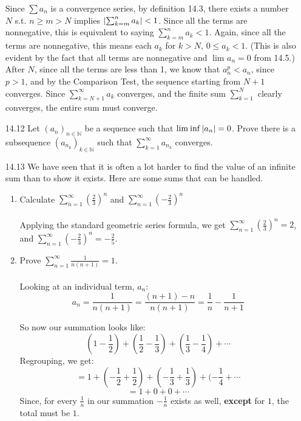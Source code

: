 \begin{enumerate}
    Since $\sum a_n$ is a convergence series, by definition 14.3, there exists a number $N$ s.t. $n \geq m > N$ implies $\left\vert \sum_{k=m}^n a_k \right\vert < 1$. Since all the terms are nonnegative, this is equivalent to saying $\sum_{k=m}^n a_k < 1$. Again, since all the terms are nonnegative, this means each $a_k$ for $k > N$, $0 \leq a_k < 1$. (This is also evident by the fact that all terms are nonnegative and $\lim_{} a_n = 0$ from 14.5.)\\

    After $N$, since all the terms are less than 1, we know that $a_n^p < a_n$, since $p > 1$, and by the Comparison Test, the sequence starting from $N+1$ converges. Since $\sum_{k=N+1}^\infty a_k$ converges, and the finite sum $\sum_{k=1}^N$ clearly converges, the entire sum must converge.
  \item [14.12]
    Let $(a_n)_{n \in \mathds{N}}$ be a sequence such that $\lim_{} \inf \left\vert a_n \right\vert = 0$. Prove there is a subsequence $(a_{n_k})_{k \in \mathds{N}}$ such that $\sum_{k=1}^\infty a_{n_k}$ converges. 
  \item [14.13]
    We have seen that it is often a lot harder to find the value of an infinite sum than to show it exists. Here are some sums that can be handled.
    \begin{enumerate}
      \item Calculate $\sum_{n=1}^\infty (\frac{2}{3})^n$ and $\sum_{n=1}^\infty (- \frac{2}{3})^n$\\\\

        Applying the standard geometric series formula, we get $\sum_{n=1}^\infty (\frac{2}{3})^n = 2$, and $\sum_{n=1}^\infty (- \frac{2}{3})^n = - \frac{2}{5}$.
      \item Prove $\sum_{n=1}^\infty \frac{1}{n(n+1)} = 1$.\\\\

        Looking at an individual term, $a_n$:
        $$a_n = \frac{1}{n(n+1)} = \frac{(n+1) - n}{n(n+1)} = \frac{1}{n} - \frac{1}{n+1}$$

        So now our summation looks like:
        $$(1 - \frac{1}{2}) + (\frac{1}{2} - \frac{1}{3}) + (\frac{1}{3} - \frac{1}{4}) + \cdots$$
        Regrouping, we get:
        $$= 1 + (- \frac{1}{2} + \frac{1}{2}) + (- \frac{1}{3} + \frac{1}{3}) + (- \frac{1}{4} + \cdots$$
        $$= 1 + 0 + 0 + \cdots$$
        Since, for every $\frac{1}{n}$ in our summation $- \frac{1}{n}$ exists as well, \textbf{except} for $1$, the total must be $1$.
        

\end{enumerate}
\end{enumerate}
